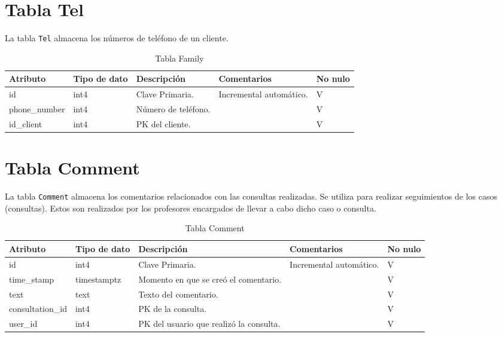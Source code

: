 \section{Tabla Tel}\label{sec:table-tel}
La tabla \texttt{Tel} almacena los números de teléfono de un cliente.

\begin{table}[H]
\centering
\label{tab:family}
\begin{tabular}{|p{3cm}|p{2.5cm}|p{4.5cm}|p{4cm}|p{1cm}|}
\hline
\textbf{Atributo} & \textbf{Tipo de dato}  & \textbf{Descripción} & \textbf{Comentarios} & \textbf{No nulo} \\ \hline
id & int4 & Clave Primaria. & Incremental automático. & V \\ \hline
phone\_number & int4 & Número de teléfono. &  & V \\ \hline
id\_client & int4 & PK del cliente. &  & V \\ \hline
\end{tabular}
\caption{Tabla Family}
\end{table}



\section{Tabla Comment}\label{sec:table-comment}
La tabla \texttt{Comment} almacena los comentarios relacionados con las consultas realizadas. Se utiliza para realizar seguimientos de los casos (consultas). Estos son realizados por los profesores encargados de llevar a cabo dicho caso o consulta.

\begin{table}[H]
\centering
\label{tab:comment}
\begin{tabular}{|p{3cm}|p{2.5cm}|p{4.5cm}|p{4cm}|p{1cm}|}
\hline
\textbf{Atributo} & \textbf{Tipo de dato}  & \textbf{Descripción} & \textbf{Comentarios} & \textbf{No nulo} \\ \hline
id & int4 & Clave Primaria. & Incremental automático. & V \\ \hline
time\_stamp & timestamptz & Momento en que se creó el comentario. &  & V \\ \hline
text & text & Texto del comentario. &  & V \\ \hline
consultation\_id & int4 & PK de la consulta. &  & V \\ \hline
user\_id & int4 & PK del usuario que realizó la consulta. &  & V \\ \hline
\end{tabular}
\caption{Tabla Comment}
\end{table}


